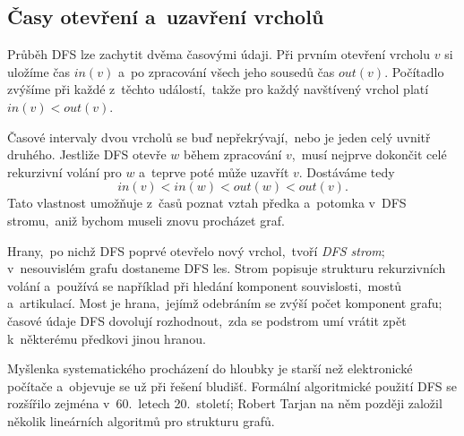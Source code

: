 \subsection{Časy otevření a~uzavření vrcholů}

Průběh DFS lze zachytit dvěma časovými údaji. Při prvním otevření vrcholu $v$ si uložíme čas $in(v)$ a~po zpracování všech jeho sousedů čas $out(v)$. Počítadlo zvýšíme při každé z~těchto událostí,~takže pro každý navštívený vrchol platí $in(v)<out(v)$.

Časové intervaly dvou vrcholů se buď nepřekrývají,~nebo je jeden celý uvnitř druhého. Jestliže DFS otevře $w$ během zpracování $v$,~musí nejprve dokončit celé rekurzivní volání pro $w$ a~teprve poté může uzavřít $v$. Dostáváme tedy
\[in(v)<in(w)<out(w)<out(v).\]
Tato vlastnost umožňuje z~časů poznat vztah předka a~potomka v~DFS stromu,~aniž bychom museli znovu procházet graf.

Hrany,~po nichž DFS poprvé otevřelo nový vrchol,~tvoří \emph{DFS strom}; v~nesouvislém grafu dostaneme DFS les. Strom popisuje strukturu rekurzivních volání a~používá se například při hledání komponent souvislosti,~mostů a~artikulací. Most je hrana,~jejímž odebráním se zvýší počet komponent grafu; časové údaje DFS dovolují rozhodnout,~zda se podstrom umí vrátit zpět k~některému předkovi jinou hranou.

\begin{remark}
    Myšlenka systematického procházení do hloubky je starší než elektronické počítače a~objevuje se už při řešení bludišť. Formální algoritmické použití DFS se rozšířilo zejména v~60.~letech 20.~století; Robert Tarjan na něm později založil několik lineárních algoritmů pro strukturu grafů.
\end{remark}

